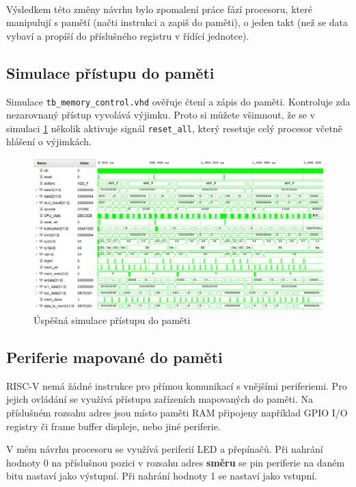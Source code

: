 \documentclass[FM,BP]{tulthesis}
\begin{document}
\paragraph{}
Výsledkem této změny návrhu bylo zpomalení práce fází procesoru, které manipulují s pamětí (načti instrukci a zapiš do paměti), o jeden takt (než se data vybaví a propíší do příslušného registru v řídící jednotce). 

\subsection{Simulace přístupu do paměti}
Simulace \verb|tb_memory_control.vhd| ověřuje čtení a zápis do paměti. Kontroluje zda nezarovnaný přístup vyvolává výjimku. Proto si můžete všimnout, že se v simulaci \ref{img:MEM_simulace} několik aktivuje signál \verb|reset_all|, který resetuje celý procesor včetně hlášení o výjimkách. 

\begin{figure}[h]
    \centering
    \includegraphics[width=\textwidth]{assets/MEM_simulation.png}
    \caption{Úspěšná simulace přístupu do paměti}
    \label{img:MEM_simulace}
\end{figure}

\subsection{Periferie mapované do paměti}
RISC-V nemá žádné instrukce pro přímou komunikací s vnějšími periferiemi. Pro jejich ovládání se využívá přístupu zařízeních mapovaných do paměti. Na příslušném rozsahu adres jsou místo paměti RAM připojeny například GPIO I/O registry či frame buffer displeje, nebo jiné periferie. 

V mém návrhu procesoru se využívá periferií LED a přepínačů. Při nahrání hodnoty 0 na příslušnou pozici v rozsahu adres \textbf{směru} se pin periferie na daném bitu nastaví jako výstupní. Při nahrání hodnoty 1 se nastaví jako vstupní. 
\end{document}
